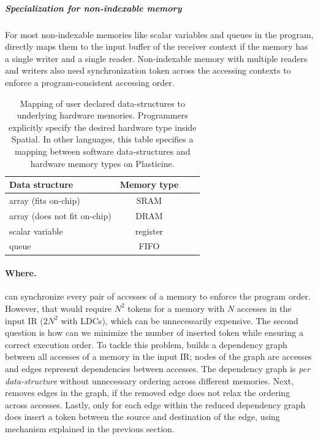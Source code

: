 \subparagraph{Specialization for non-indexable memory}
For most non-indexable memories like scalar variables and queues in the program, \name directly maps
them to the input buffer of the receiver context if the memory has a single writer and a single
reader.
Non-indexable memory with multiple readers and writers also need synchronization token across
the accessing contexts to enforce a program-consistent accessing order.

\begin{table}
  \centering
\begin{tabular}{lccc}
  \toprule
 Data structure & Memory type \\ \midrule
  array (fits on-chip) & SRAM \\
  array (does not fit on-chip) & DRAM \\
  scalar variable & register \\
  queue & FIFO \\
 \bottomrule
\end{tabular}
\caption[Mapping of data-structures to hardware memories]{
  Mapping of user declared data-structures to underlying hardware memories. 
  Programmers explicitly specify the desired hardware type inside Spatial. 
  In other languages, this table specifies a mapping between software data-structures 
  and hardware memory types on Plasticine.
}
\label{tab:memtype}
\end{table}

\paragraph{Where.}
\name can synchronize every pair of accesses of a memory to enforce the program order. However, that
would require $N^2$ tokens for a memory with $N$ accesses in the input IR ($2N^2$ with LDCs), which can be
unnecessarily expensive.
The second question is how can we minimize the number of inserted token while ensuring a correct
execution order.
To tackle this problem, \name builds a dependency graph between all accesses of a memory in the input IR; 
nodes of the graph are accesses and edges represent dependencies between accesses.
The dependency graph is \emph{per data-structure} without unnecessary ordering across different memories.
Next, \name removes edges in the graph, if the removed edge does not relax the ordering
across accesses.
Lastly, only for each edge within the reduced dependency graph does \name insert a token
between the source and destination of the edge, using mechanism explained in the previous section.

